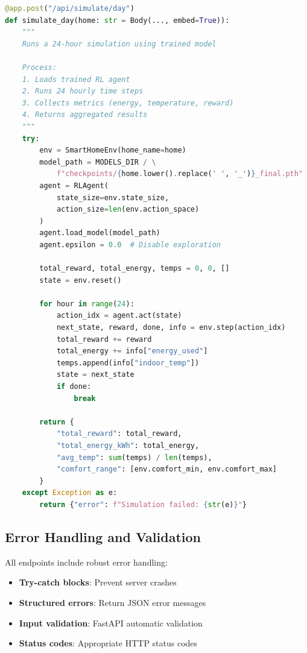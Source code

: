 \documentclass[12pt,a4paper]{article}
\begin{document}
\begin{lstlisting}[language=Python, caption=24-hour simulation endpoint]
@app.post("/api/simulate/day")
def simulate_day(home: str = Body(..., embed=True)):
    """
    Runs a 24-hour simulation using trained model
    
    Process:
    1. Loads trained RL agent
    2. Runs 24 hourly time steps
    3. Collects metrics (energy, temperature, reward)
    4. Returns aggregated results
    """
    try:
        env = SmartHomeEnv(home_name=home)
        model_path = MODELS_DIR / \
            f"checkpoints/{home.lower().replace(' ', '_')}_final.pth"
        agent = RLAgent(
            state_size=env.state_size,
            action_size=len(env.action_space)
        )
        agent.load_model(model_path)
        agent.epsilon = 0.0  # Disable exploration
        
        total_reward, total_energy, temps = 0, 0, []
        state = env.reset()
        
        for hour in range(24):
            action_idx = agent.act(state)
            next_state, reward, done, info = env.step(action_idx)
            total_reward += reward
            total_energy += info["energy_used"]
            temps.append(info["indoor_temp"])
            state = next_state
            if done:
                break
        
        return {
            "total_reward": total_reward,
            "total_energy_kWh": total_energy,
            "avg_temp": sum(temps) / len(temps),
            "comfort_range": [env.comfort_min, env.comfort_max]
        }
    except Exception as e:
        return {"error": f"Simulation failed: {str(e)}"}
\end{lstlisting}

\subsection{Error Handling and Validation}

All endpoints include robust error handling:

\begin{itemize}[leftmargin=*]
    \item \textbf{Try-catch blocks}: Prevent server crashes
    \item \textbf{Structured errors}: Return JSON error messages
    \item \textbf{Input validation}: FastAPI automatic validation
    \item \textbf{Status codes}: Appropriate HTTP status codes
\end{itemize}
\end{document}
